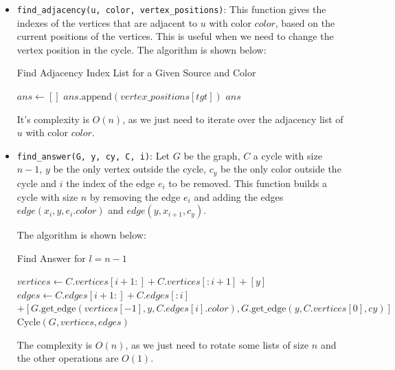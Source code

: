 \begin{itemize}
    \item \texttt{find\_adjacency(u, color, vertex\_positions)}: This function gives the indexes of the 
    vertices that are adjacent to $u$ with color $color$, based on the current 
    positions of the vertices. This is useful when we need to change the vertex position in the cycle.
    The algorithm is shown below:

    \begin{algorithm}
        \caption{Find Adjacency Index List for a Given Source and Color}
        \begin{algorithmic}[1]
                \State $ans \gets []$
                    \State $ans.\text{append}(vertex\_positions[tgt])$
                \EndFor
                \State \Return $ans$ 
            \EndFunction
        \end{algorithmic}
    \end{algorithm}

    It's complexity is $O(n)$, as we just need to iterate over the adjacency list of $u$ with color $color$.

    \item \texttt{find\_answer(G, y, cy, C, i)}: Let $G$ be the graph, $C$ a cycle with
    size $n-1$, $y$ be the only vertex outside the cycle, $c_y$ be the only color
    outside the cycle and $i$ the index of the edge $e_i$ to be removed. This function 
    builds a cycle with size $n$ by removing the edge $e_i$ and adding the edges
    $edge(x_{i}, y, e_i.color)$ and $edge(y, x_{i+1}, c_y)$.

    The algorithm is shown below:

    \begin{algorithm}
        \caption{Find Answer for \( l = n - 1 \)}
        \begin{algorithmic}[1]
                \State $vertices \gets C.vertices[i + 1:] + C.vertices[:i + 1] + [y]$
                \State $edges \gets C.edges[i + 1:] + C.edges[:i]$
                \State \hspace{2.5em} $+ [G.\text{get\_edge}(vertices[-1], y, C.edges[i].color), G.\text{get\_edge}(y, C.vertices[0], cy)]$
                \State \Return $\text{Cycle}(G, vertices, edges)$
            \EndFunction
        \end{algorithmic}
    \end{algorithm}

    The complexity is $O(n)$, as we just need to rotate some lists of size $n$ and the other operations are $O(1)$.
\end{itemize}

